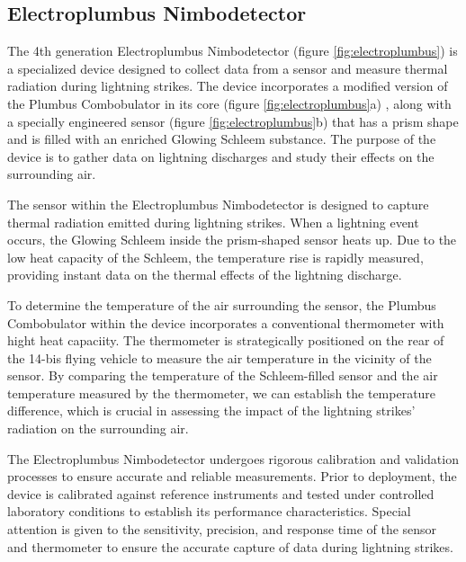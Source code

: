 \documentclass[english]{cenarticle} %
\begin{document}
\subsection{Electroplumbus Nimbodetector}
%
  The 4th generation Electroplumbus Nimbodetector (figure \ref{fig:electroplumbus}) is a specialized device designed to collect data from a sensor and measure thermal radiation during lightning strikes. The device incorporates a modified version of the Plumbus Combobulator in its core (figure \ref{fig:electroplumbus}a) , along with a specially engineered sensor (figure \ref{fig:electroplumbus}b) that has a prism shape and is filled with an enriched Glowing Schleem substance. The purpose of the device is to gather data on lightning discharges and study their effects on the surrounding air.\par
%
  The sensor within the Electroplumbus Nimbodetector is designed to capture thermal radiation emitted during lightning strikes. When a lightning event occurs, the Glowing Schleem inside the prism-shaped sensor heats up. Due to the low heat capacity of the Schleem, the temperature rise is rapidly measured, providing instant data on the thermal effects of the lightning discharge.\par
%
  To determine the temperature of the air surrounding the sensor, the Plumbus Combobulator within the device incorporates a conventional thermometer with hight heat capaciity. The thermometer is strategically positioned on the rear of the 14-bis flying vehicle to measure the air temperature in the vicinity of the sensor. By comparing the temperature of the Schleem-filled sensor and the air temperature measured by the thermometer, we can establish the temperature difference, which is crucial in assessing the impact of the lightning strikes' radiation on the surrounding air.\par
%
  The Electroplumbus Nimbodetector undergoes rigorous calibration and validation processes to ensure accurate and reliable measurements. Prior to deployment, the device is calibrated against reference instruments and tested under controlled laboratory conditions to establish its performance characteristics. Special attention is given to the sensitivity, precision, and response time of the sensor and thermometer to ensure the accurate capture of data during lightning strikes.\par
%
\end{document}
